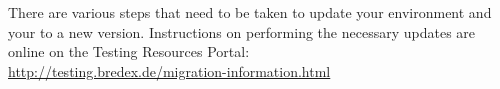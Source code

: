 There are various steps that need to be taken to update your environment and your \gdprojects{} to a new version. Instructions on performing the necessary updates are online on the Testing Resources Portal:\\
\url{http://testing.bredex.de/migration-information.html}
 












